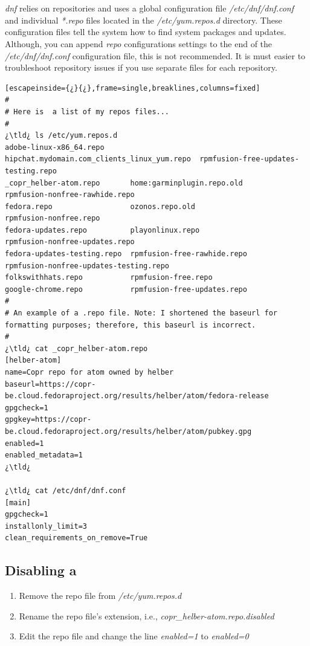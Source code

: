 	\section{}

\emph{dnf} relies on repositories and uses a global configuration file \textsl{/etc/dnf/dnf.conf} and individual \textsl{*.repo} files located in the \textsl{/etc/yum.repos.d} directory. These configuration files tell the system how to find system packages and updates. Although, you can append \emph{repo} configurations settings to the end of the  \textsl{/etc/dnf/dnf.conf} configuration file, this is not recommended. It is must easier to troubleshoot repository issues if you use separate files for each repository.

\begin{lstlisting}[escapeinside={¿}{¿},frame=single,breaklines,columns=fixed]
#
# Here is  a list of my repos files...
#
¿\tld¿ ls /etc/yum.repos.d
adobe-linux-x86_64.repo      hipchat.mydomain.com_clients_linux_yum.repo  rpmfusion-free-updates-testing.repo
_copr_helber-atom.repo       home:garminplugin.repo.old                 rpmfusion-nonfree-rawhide.repo
fedora.repo                  ozonos.repo.old                            rpmfusion-nonfree.repo
fedora-updates.repo          playonlinux.repo                           rpmfusion-nonfree-updates.repo
fedora-updates-testing.repo  rpmfusion-free-rawhide.repo                rpmfusion-nonfree-updates-testing.repo
folkswithhats.repo           rpmfusion-free.repo
google-chrome.repo           rpmfusion-free-updates.repo
#
# An example of a .repo file. Note: I shortened the baseurl for formatting purposes; therefore, this baseurl is incorrect.
#
¿\tld¿ cat _copr_helber-atom.repo 
[helber-atom]
name=Copr repo for atom owned by helber
baseurl=https://copr-be.cloud.fedoraproject.org/results/helber/atom/fedora-release
gpgcheck=1
gpgkey=https://copr-be.cloud.fedoraproject.org/results/helber/atom/pubkey.gpg
enabled=1
enabled_metadata=1
¿\tld¿ 

¿\tld¿ cat /etc/dnf/dnf.conf
[main]
gpgcheck=1
installonly_limit=3
clean_requirements_on_remove=True	
\end{lstlisting}

	\subsection{Disabling a }

\begin{enumerate}
	\item{Remove the repo file from \textsl{/etc/yum.repos.d}}
	\item{Rename the repo file's extension, i.e., \textsl{copr\_helber-atom.repo.disabled}}
	\item{Edit the repo file and change the line \emph{enabled=1} to \emph{enabled=0}}
\end{enumerate}


